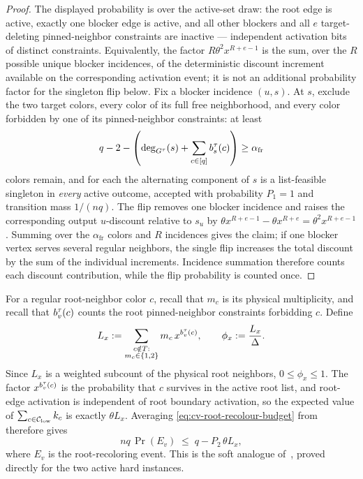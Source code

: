 \begin{proof}
The displayed probability is over the active-set draw: the root edge is
active, exactly one blocker edge is active, and all other blockers and all
\(e\) target-deleting pinned-neighbor constraints are inactive --- independent activation bits
of distinct constraints.  Equivalently, the factor
\(R\theta^2x^{R+e-1}\) is the sum, over the \(R\) possible unique blocker
incidences, of the deterministic discount increment available on the
corresponding activation event; it is not an additional probability factor
for the singleton flip below.  Fix a blocker incidence $(u,s)$. At $s$, exclude the
two target colors, every color of
its full free neighborhood, and every color forbidden by one of its
pinned-neighbor constraints: at least
\[
  q-2-\left(\deg_{G^\tau}(s)+\sum_{c\in[q]}b_s^\tau(c)\right)
  \ge\alpha_{\mathrm{fr}}
\]
colors remain, and for each the alternating component of $s$ is a list-feasible
singleton in \emph{every} active outcome, accepted with probability $P_1=1$
and transition mass $1/(nq)$. The flip removes one blocker incidence and raises the
corresponding output $u$-discount relative to $s_u$ by
$\theta x^{R+e-1}-\theta x^{R+e}=\theta^2x^{R+e-1}$. Summing over
the $\alpha_{\mathrm{fr}}$ colors and $R$ incidences gives the claim; if one blocker
vertex serves several regular neighbors, the single flip increases the total
discount by the sum of the individual increments. Incidence summation
therefore counts each discount contribution, while the flip probability
is counted once.
\end{proof}

For a regular root-neighbor color \(c\), recall that \(m_c\) is its
physical multiplicity, and recall that \(b_v^\tau(c)\) counts the root
pinned-neighbor constraints forbidding \(c\). Define
\begin{equation}\label{eq:cv-Lx}
  L_x:=\sum_{\substack{c\notin T:\\m_c\in\left\{1,2\right\}}}
      m_c\,x^{b_v^\tau(c)},\qquad
  \phi_x:=\frac{L_x}{\Delta} .
\end{equation}
Since $L_x$ is a weighted subcount of the physical root neighbors,
$0\le \phi_x\le1$.
The factor $x^{b_v^\tau(c)}$ is the probability that $c$ survives in the
active root list, and root-edge activation is independent of root boundary
activation, so the expected value of
$\sum_{c\in\mathcal C_{\rm low}}k_c$ is exactly $\theta L_x$.
Averaging \eqref{eq:cv-root-recolour-budget} from
 therefore gives
\begin{equation}\label{eq:cv-root-event}
  nq\,\Pr(E_v)\;\le\;q-P_2\,\theta L_x ,
\end{equation}
where $E_v$ is the root-recoloring event. This is the soft analogue
of~\cite[Eq.~(18)]{CarlsonVigoda2024}, proved directly for the two active
hard instances.

